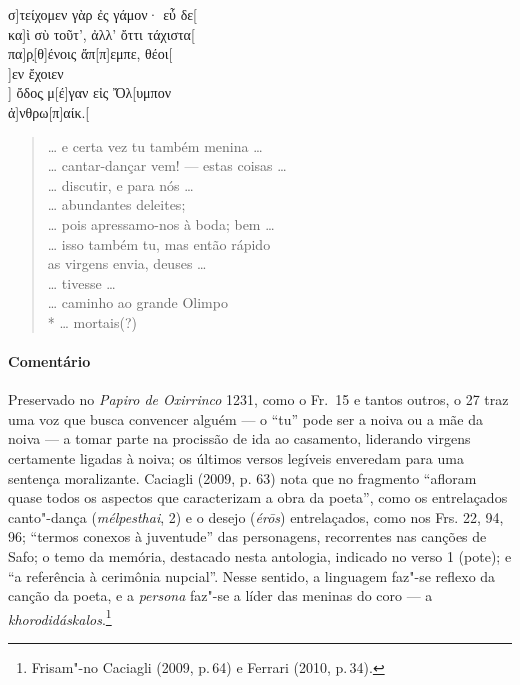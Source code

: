 {\begin{gkverse}
σ]τείχομεν γὰρ ἐς γάμον· εὖ δε[\\
κα]ὶ σὺ τοῦτ’, ἀλλ’ ὄττι τάχιστα[\\
πα]ρ̣[θ]ένοις ἄπ[π]εμπε, θέοι[\\
]εν ἔχοιεν\\
      ] ὄδος̣ μ[έ]γαν εἰς Ὄλ[υμπον\\
       ἀ]νθρω[π\qquad]αίκ.[
\end{gkverse}
\pagebreak
\begin{verse}
\ldots{} e certa vez tu também menina \ldots{}\\
\ldots{} cantar-dançar vem! --- estas coisas \ldots{}\\
\ldots{} discutir, e para nós \ldots{}\\
\ldots{} abundantes deleites;\\
\ldots{} pois apressamo-nos à boda; bem \ldots{}\\
\ldots{} isso também tu, mas então rápido\\
as virgens envia, deuses \ldots{}\\
\ldots{} tivesse \ldots{}\\
\ldots{} caminho ao grande Olimpo\\*
\ldots{} mortais(?)
\end{verse}

{\paragraph{Comentário} Preservado no \textit{Papiro de Oxirrinco} 1231, como o Fr.~15 e tantos outros, o 27 traz uma voz que busca convencer alguém  --- o ``tu''
pode ser a noiva ou a mãe da noiva --- a tomar parte na procissão de
ida ao casamento, liderando virgens certamente ligadas à noiva; os últimos versos
legíveis enveredam para uma sentença moralizante.
Caciagli (2009, p. 63) nota que no fragmento “afloram quase todos os aspectos que caracterizam a obra da poeta'', como os entrelaçados canto"-dança (\textit{mélpesthai}, 2) e o desejo (\textit{érōs}) entrelaçados, como nos Frs. 22, 94, 96; ``termos conexos à juventude'' das personagens, recorrentes nas canções de Safo; o temo da memória, destacado nesta antologia, indicado no verso 1 (pote); e ``a referência à cerimônia nupcial''. Nesse sentido, a linguagem faz"-se reflexo da canção da poeta, e a \textit{persona} faz"-se a líder das meninas do coro --- a \textit{khorodidáskalos}.\footnote{Frisam"-no Caciagli (2009, p.\,64) e Ferrari (2010, p.\,34).}}



}
